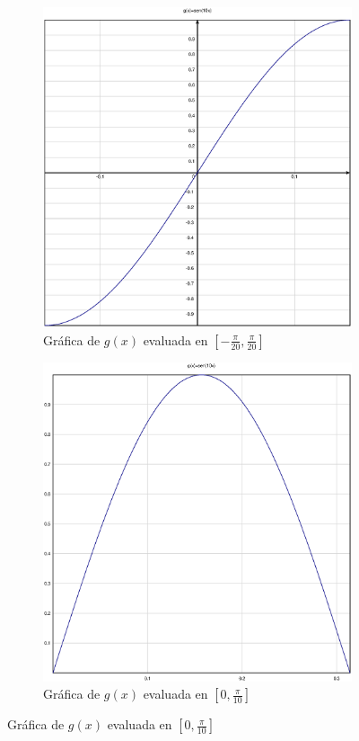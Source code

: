 \documentclass[10pt]{article}
\begin{document}
\begin{figure}[H]
\begin{subfigure}[b]{0.3\textwidth}
        \includegraphics[width=\textwidth]{figures/Zoom2.eps}
        \centering
        \caption{Gráfica de $g(x)$ evaluada en $\left[-\frac{\pi}{20},\frac{\pi}{20}\right]$}
        \label{im:zoom2}
    \end{subfigure}
    \hfill
    \begin{subfigure}[b]{0.3\textwidth}
        \includegraphics[width=\textwidth]{figures/Zoom3.eps}
        \centering
        \caption{Gráfica de $g(x)$ evaluada en $\left[0,\frac{\pi}{10}\right]$}
        \label{im:zoom3}
    \end{subfigure}
\end{figure}
\end{document}
